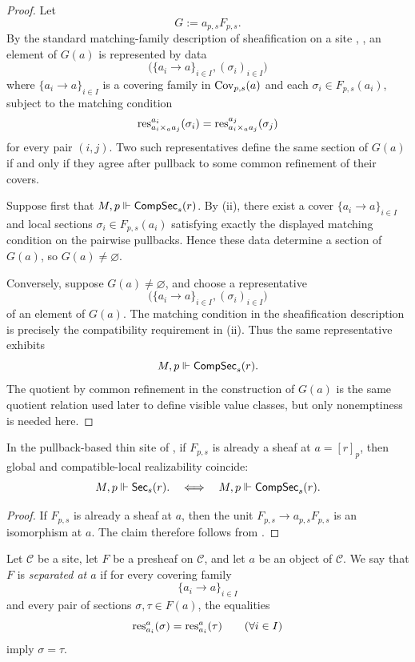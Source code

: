 \begin{proof}
Let
\[
G:=a_{p,s}F_{p,s}.
\]
By the standard matching-family description of sheafification on a site \cite[Chap.~III, \S2]{MacLaneMoerdijk1994}, \cite[Part~B2.2]{Johnstone2002}, an element of $G(a)$ is represented by data
\[
\bigl(\{a_i\to a\}_{i\in I},(\sigma_i)_{i\in I}\bigr)
\]
where $\{a_i\to a\}_{i\in I}$ is a covering family in $\mathrm{Cov}_{p,s}(a)$ and each $\sigma_i\in F_{p,s}(a_i)$, subject to the matching condition
\[
\mathrm{res}_{a_i\times_a a_j}^{a_i}(\sigma_i)=\mathrm{res}_{a_i\times_a a_j}^{a_j}(\sigma_j)
\]
for every pair $(i,j)$. Two such representatives define the same section of $G(a)$ if and only if they agree after pullback to some common refinement of their covers.

Suppose first that $M,p\Vdash\mathsf{CompSec}_s(r)$. By (ii), there exist a cover $\{a_i\to a\}_{i\in I}$ and local sections $\sigma_i\in F_{p,s}(a_i)$ satisfying exactly the displayed matching condition on the pairwise pullbacks. Hence these data determine a section of $G(a)$, so $G(a)\neq\varnothing$.

Conversely, suppose $G(a)\neq\varnothing$, and choose a representative
\[
\bigl(\{a_i\to a\}_{i\in I},(\sigma_i)_{i\in I}\bigr)
\]
of an element of $G(a)$. The matching condition in the sheafification description is precisely the compatibility requirement in (ii). Thus the same representative exhibits
\[
M,p\Vdash \mathsf{CompSec}_s(r).
\]
The quotient by common refinement in the construction of $G(a)$ is the same quotient relation used later to define visible value classes, but only nonemptiness is needed here.
\end{proof}

\begin{corollary}\label{cor:sheaf-local-to-global}
In the pullback-based thin site of , if $F_{p,s}$ is already a sheaf at $a=[r]_p$, then global and compatible-local realizability coincide:
\[
M,p\Vdash \mathsf{Sec}_s(r).
\quad\Longleftrightarrow\quad
M,p\Vdash \mathsf{CompSec}_s(r).
\]
\end{corollary}

\begin{proof}
If $F_{p,s}$ is already a sheaf at $a$, then the unit $F_{p,s}\to a_{p,s}F_{p,s}$ is an isomorphism at $a$. The claim therefore follows from .
\end{proof}

\begin{definition}\label{def:separated-at-a}
Let $\mathcal C$ be a site, let $F$ be a presheaf on $\mathcal C$, and let $a$ be an object of $\mathcal C$. We say that $F$ is \emph{separated at $a$} if for every covering family
\[
\{a_i\to a\}_{i\in I}
\]
and every pair of sections $\sigma,\tau\in F(a)$, the equalities
\[
\mathrm{res}_{a_i}^{a}(\sigma)=\mathrm{res}_{a_i}^{a}(\tau)
\qquad
(\forall i\in I)
\]
imply $\sigma=\tau$.
\end{definition}

